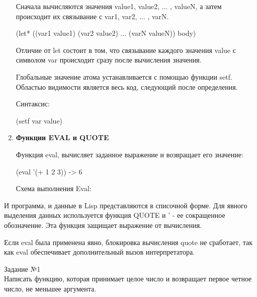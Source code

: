 \begin{enumerate}
Сначала вычисляются значения value1, value2, ... , valueN, а затем происходит их связывание с var1, var2, ... , varN. 

(let* ((var1 value1) (var2 value2) ... (varN valueN)) body)

Отличие от let состоит в том, что связывание каждого значения value с символом var происходит сразу после вычисления значения.

Глобальные значение атома устанавливается с помощью функции setf. Областью видимости является весь код, следующий после определения.

Синтаксис: 

(setf var value)

\item \textbf{Функции EVAL и QUOTE}

Функция eval, вычисляет заданное выражение и возвращает его значение:

(eval ’(+ 1 2 3)) -> 6

Схема выполнения Eval:
\begin{figure}[ht!]
\end{figure}
\end{enumerate}

И программа, и данные в Lisp представляются в списочной форме. Для явного выделения данных используется функция QUOTE и ' - ее сокращенное обозначение. Эта функция защищает выражение от вычисления. 

Если eval была применена явно, блокировка вычисления quote не сработает, так как eval обеспечивает дополнительный вызов интерпретатора.

\newpage
\vspace*{10mm}
{\LARGE Задание №1}\\

Написать функцию, которая принимает целое число и возвращает первое четное число, не меньшее аргумента.

